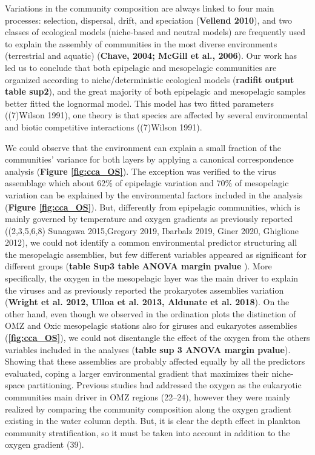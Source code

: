 \documentclass[fleqn,10pt]{wlscirep}
\begin{document}
Variations in the community composition are always linked to four main processes: selection, dispersal, drift, and speciation (\textbf{Vellend 2010}), and two classes of ecological models (niche-based and neutral models) are frequently used to explain the assembly of communities in the most diverse environments (terrestrial and aquatic) (\textbf{Chave, 2004; McGill et al., 2006}). Our work has led us to conclude that both epipelagic and mesopelagic communities are organized according to niche/deterministic ecological models (\textbf{radifit output table sup2}), and the great majority of both epipelagic and mesopelagic samples better fitted the lognormal model. This model has two fitted parameters ((7)Wilson 1991), one theory is that species are affected by several environmental and biotic competitive interactions ((7)Wilson 1991). 

We could observe that the environment can explain a small fraction of the communities’ variance for both layers by applying a canonical correspondence analysis (\textbf{Figure \ref{fig:cca_OS}}). The exception was verified to the virus assemblage which about 62\% of epipelagic variation and 70\% of mesopelagic variation can be explained by the environmental factors included in the analysis (\textbf{Figure \ref{fig:cca_OS}}). But, differently from epipelagic communities, which is mainly governed by temperature and oxygen gradients as previously reported ((2,3,5,6,8) Sunagawa 2015,Gregory 2019, Ibarbalz 2019, Giner 2020, Ghiglione 2012), we could not identify a common environmental predictor structuring all the mesopelagic assemblies, but few different variables appeared as significant for different groups (\textbf{table Sup3 table ANOVA margin pvalue }). More specifically, the oxygen in the mesopelagic layer was the main driver to explain the viruses and as previously reported the prokaryotes assemblies variation (\textbf{Wright et al. 2012, Ulloa et al. 2013, Aldunate et al. 2018}). On the other hand, even though we observed in the ordination plots the distinction of OMZ and Oxic mesopelagic stations also for giruses and eukaryotes assemblies (\textbf{\ref{fig:cca_OS}}), we could not disentangle the effect of the oxygen from the others variables included in the analyses (\textbf{table sup 3 ANOVA margin pvalue}). Showing that these assemblies are probably affected equally by all the predictors evaluated, coping a larger environmental gradient that maximizes their niche-space partitioning. Previous studies had addressed the oxygen as the eukaryotic communities main driver in OMZ regions (22–24), however they were mainly realized by comparing the community composition along the oxygen gradient existing in the water column depth. But, it is clear the depth effect in plankton community stratification, so it must be taken into account in addition to the oxygen gradient (39).
\end{document}
